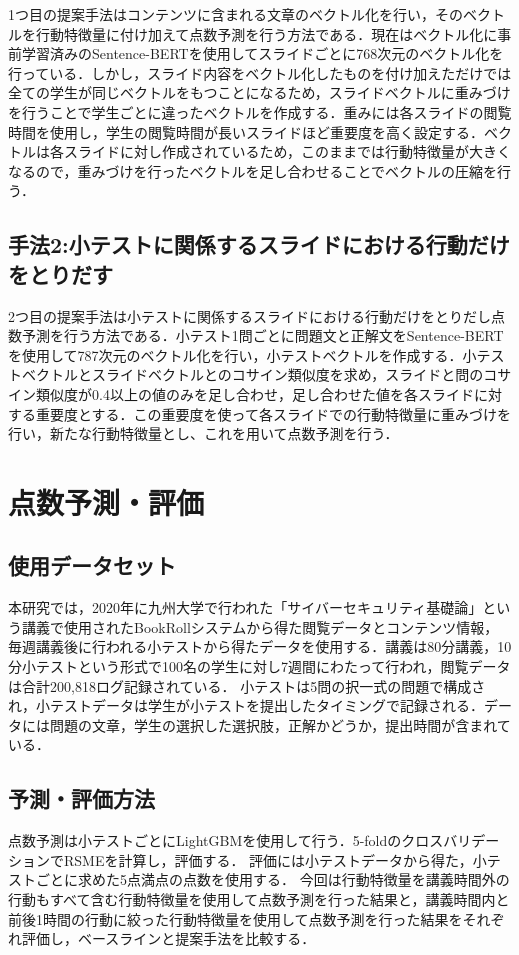 \documentclass[a4j]{jarticle}
\begin{document}
1つ目の提案手法はコンテンツに含まれる文章のベクトル化を行い，そのベクトルを行動特徴量に付け加えて点数予測を行う方法である．現在はベクトル化に事前学習済みのSentence-BERT\cite{sentence-BERT}を使用してスライドごとに768次元のベクトル化を行っている．しかし，スライド内容をベクトル化したものを付け加えただけでは全ての学生が同じベクトルをもつことになるため，スライドベクトルに重みづけを行うことで学生ごとに違ったベクトルを作成する．重みには各スライドの閲覧時間を使用し，学生の閲覧時間が長いスライドほど重要度を高く設定する．ベクトルは各スライドに対し作成されているため，このままでは行動特徴量が大きくなるので，重みづけを行ったベクトルを足し合わせることでベクトルの圧縮を行う．


\subsection{手法2:小テストに関係するスライドにおける行動だけをとりだす}

2つ目の提案手法は小テストに関係するスライドにおける行動だけをとりだし点数予測を行う方法である．小テスト1問ごとに問題文と正解文をSentence-BERTを使用して787次元のベクトル化を行い，小テストベクトルを作成する．小テストベクトルとスライドベクトルとのコサイン類似度を求め，スライドと問のコサイン類似度が0.4以上の値のみを足し合わせ，足し合わせた値を各スライドに対する重要度とする．この重要度を使って各スライドでの行動特徴量に重みづけを行い，新たな行動特徴量とし、これを用いて点数予測を行う．


\section{点数予測・評価}

\subsection{使用データセット}

本研究では，2020年に九州大学で行われた「サイバーセキュリティ基礎論」という講義で使用されたBookRollシステムから得た閲覧データとコンテンツ情報，毎週講義後に行われる小テストから得たデータを使用する．講義は80分講義，10分小テストという形式で100名の学生に対し7週間にわたって行われ，閲覧データは合計200,818ログ記録されている．
小テストは5問の択一式の問題で構成され，小テストデータは学生が小テストを提出したタイミングで記録される．データには問題の文章，学生の選択した選択肢，正解かどうか，提出時間が含まれている．

\subsection{予測・評価方法}
点数予測は小テストごとにLightGBMを使用して行う．5-foldのクロスバリデーションでRSMEを計算し，評価する．
評価には小テストデータから得た，小テストごとに求めた5点満点の点数を使用する．
今回は行動特徴量を講義時間外の行動もすべて含む行動特徴量を使用して点数予測を行った結果と，講義時間内と前後1時間の行動に絞った行動特徴量を使用して点数予測を行った結果をそれぞれ評価し，ベースラインと提案手法を比較する．
\end{document}
